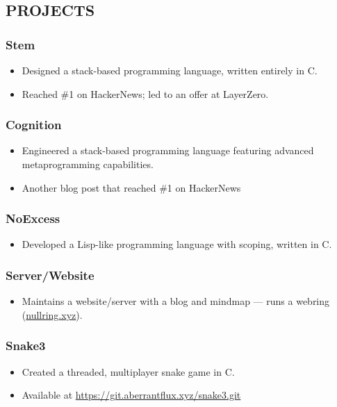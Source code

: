\documentclass[10pt,letterpaper]{article}
\begin{document}
\begin{minipage}[t]{0.47\textwidth}
\subsection*{PROJECTS}
\label{sec:orge82cd19}
\subsubsection*{Stem}
\label{sec:orgfb19df5}
\begin{itemize}
\item Designed a stack-based programming language, written entirely in C.
\item Reached \#1 on HackerNews; led to an offer at LayerZero.
\end{itemize}
\subsubsection*{Cognition}
\label{sec:org4df69fe}
\begin{itemize}
\item Engineered a stack-based programming language featuring advanced metaprogramming capabilities.
\item Another blog post that reached \#1 on HackerNews
\end{itemize}
\subsubsection*{NoExcess}
\label{sec:org93f1121}
\begin{itemize}
\item Developed a Lisp-like programming language with scoping, written in C.
\end{itemize}
\subsubsection*{Server/Website}
\label{sec:orga313b21}
\begin{itemize}
\item Maintains a website/server with a blog and mindmap — runs a webring (\href{https://nullring.xyz}{nullring.xyz}).
\end{itemize}
\subsubsection*{Snake3}
\label{sec:org49e5353}
\begin{itemize}
\item Created a threaded, multiplayer snake game in C.
\item Available at \href{https://git.aberrantflux.xyz/snake3.git}{https://git.aberrantflux.xyz/snake3.git}
\end{itemize}

\end{minipage}
\end{document}
